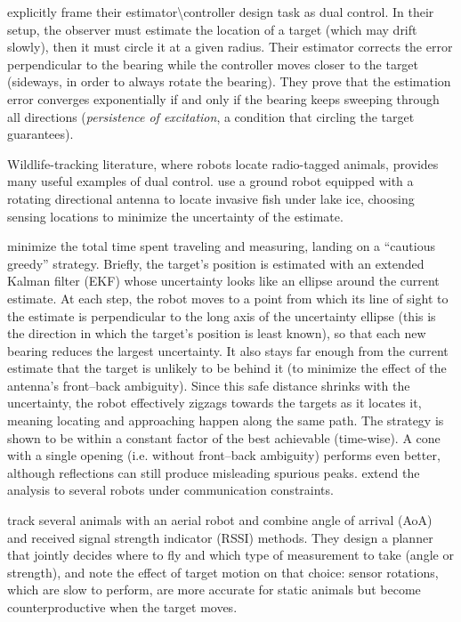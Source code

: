 \documentclass[journal,a4paper]{IEEEtran}
\begin{document}
\citet{deghat2014localization} explicitly frame their estimator\textbackslash controller design task as dual control. In their setup, the observer must estimate the location of a target (which may drift slowly), then it must circle it at a given radius. Their estimator corrects the error perpendicular to the bearing while the controller moves closer to the target (sideways, in order to always rotate the bearing). They prove that the estimation error converges exponentially if and only if the bearing keeps sweeping through all directions (\emph{persistence of excitation}, a condition that circling the target guarantees).

Wildlife-tracking literature, where robots locate radio-tagged animals, provides many useful examples of dual control. \citet{tokekar2011active} use a ground robot equipped with a rotating directional antenna to locate invasive fish under lake ice, choosing sensing locations to minimize the
uncertainty of the estimate. 

\citet{vanderhook2014cautious} minimize
the total time spent traveling and measuring, landing on a ``cautious greedy'' strategy. Briefly, the target's position is estimated with an extended Kalman filter (EKF) whose uncertainty looks like an ellipse around the current estimate. At each step, the robot moves to a point
from which its line of sight to the estimate is perpendicular to the long axis of the uncertainty ellipse (this is the direction in which the target's position is least known), so that each new bearing reduces the largest uncertainty. It also stays far enough from the current estimate that the target
is unlikely to be behind it (to minimize the effect of the antenna's front--back ambiguity). Since this safe distance shrinks with the uncertainty, the robot effectively zigzags towards the targets as it locates it, meaning locating and approaching happen along the same path. The strategy is shown to be within a constant factor of the best achievable (time-wise). A cone with a single opening (i.e. without front--back ambiguity) performs even better, although reflections can still produce misleading
spurious peaks.
\citet{vanderhook2015algorithms} extend the analysis to several robots under communication constraints.

\citet{chen2023conservationbots} track several animals with an aerial robot and combine angle of arrival (AoA) and received signal strength indicator (RSSI) methods. They design a planner that jointly decides where to fly and which type of measurement to take (angle or strength), and note the effect of target motion on that choice: sensor rotations, which are slow to perform, are more accurate for static animals but become
counterproductive when the target moves.
\end{document}

